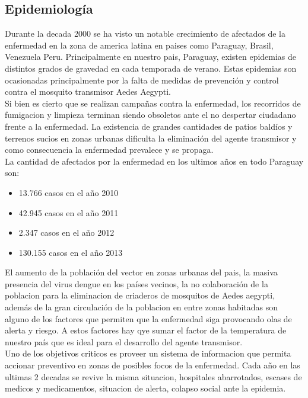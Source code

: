 
\subsection{Epidemiología}

Durante la decada 2000 se ha visto un notable crecimiento de afectados de la enfermedad en la zona de america latina en paises como Paraguay, Brasil, Venezuela Peru. Principalmente en nuestro pais, Paraguay, existen epidemias  de distintos grados de gravedad en cada temporada de verano. Estas epidemias son ocasionadas principalmente por la falta de medidas de prevención y control contra el mosquito transmisor Aedes Aegypti.\\

Si bien es cierto que se realizan campañas contra la enfermedad, los recorridos de fumigacion y limpieza terminan siendo obsoletos ante el no despertar ciudadano frente a la enfermedad. La existencia de grandes cantidades de patios baldíos y terrenos sucios en zonas urbanas dificulta la eliminación del agente transmisor y como consecuencia la enfermedad prevalece y se propaga.\\

La cantidad de afectados por la enfermedad en los ultimos años en todo Paraguay son:
\begin{itemize}
\item 13.766 casos en el año 2010
\item 42.945 casos en el año 2011
\item 2.347 casos en el año 2012
\item 130.155 casos en el año 2013\\
\end{itemize}

El aumento de la población del vector en zonas urbanas del pais, la masiva presencia del virus dengue en los países vecinos, la no colaboración de la poblacion para la eliminacion de criaderos de mosquitos de Aedes aegypti, además de la gran circulación de la poblacion en entre zonas habitadas son alguno de los factores que permiten que la enfermedad siga provocando olas de alerta y riesgo. A estos factores hay qye sumar el factor de la temperatura de nuestro país que es ideal para el desarrollo del agente transmisor.\\


Uno de los objetivos criticos es proveer un sistema de informacion que permita accionar preventivo en zonas de posibles focos de la enfermedad. Cada año en las ultimas 2 decadas se revive la misma situacion, hospitales abarrotados, escases de medicos y medicamentos, situacion de alerta, colapso social ante la epidemia.\\

